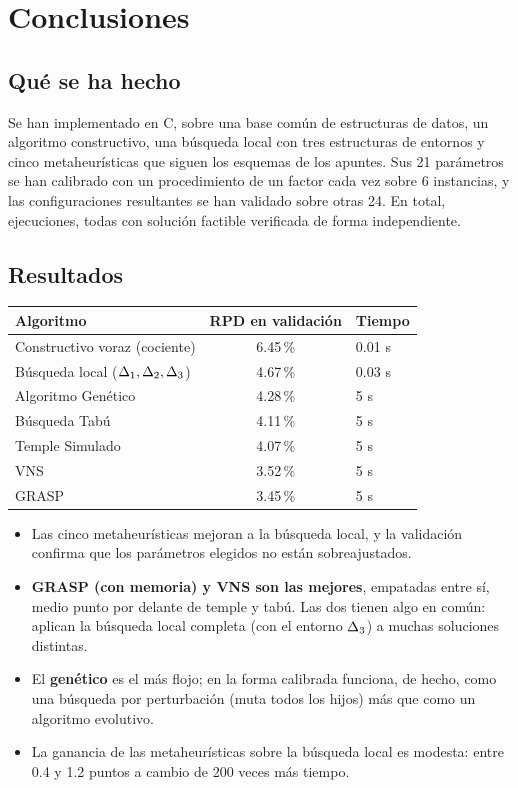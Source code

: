 \section{Conclusiones}\label{sec:conclusiones}

\subsection{Qué se ha hecho}

Se han implementado en C, sobre una base común de estructuras de datos, un algoritmo
constructivo, una búsqueda local con tres estructuras de entornos y cinco metaheurísticas que
siguen los esquemas de los apuntes. Sus 21 parámetros se han calibrado con un procedimiento
de un factor cada vez sobre 6 instancias, y las configuraciones resultantes se han validado
sobre otras 24. En total,  ejecuciones, todas con solución
factible verificada de forma independiente.

\subsection{Resultados}

\begin{center}
\begin{tabular}{@{}lcl@{}}
\toprule
Algoritmo & RPD en validación & Tiempo \\ \midrule
Constructivo voraz (cociente) & 6.45\,\% & 0.01 s \\
Búsqueda local ($\Delta_{1},\Delta_{2},\Delta_{3}$) & 4.67\,\% & 0.03 s \\
Algoritmo Genético & 4.28\,\% & 5 s \\
Búsqueda Tabú & 4.11\,\% & 5 s \\
Temple Simulado & 4.07\,\% & 5 s \\
VNS & 3.52\,\% & 5 s \\
GRASP & 3.45\,\% & 5 s \\
\bottomrule
\end{tabular}
\end{center}

\begin{itemize}
  \item Las cinco metaheurísticas mejoran a la búsqueda local, y la validación confirma que
        los parámetros elegidos no están sobreajustados.
  \item \textbf{GRASP (con memoria) y VNS son las mejores}, empatadas entre sí, medio punto
        por delante de temple y tabú. Las dos tienen algo en común: aplican la búsqueda
        local completa (con el entorno $\Delta_{3}$) a muchas soluciones distintas.
  \item El \textbf{genético} es el más flojo; en la forma calibrada funciona, de hecho, como
        una búsqueda por perturbación (muta todos los hijos) más que como un algoritmo
        evolutivo.
  \item La ganancia de las metaheurísticas sobre la búsqueda local es modesta: entre 0.4 y
        1.2 puntos a cambio de 200 veces más tiempo.
\end{itemize}

